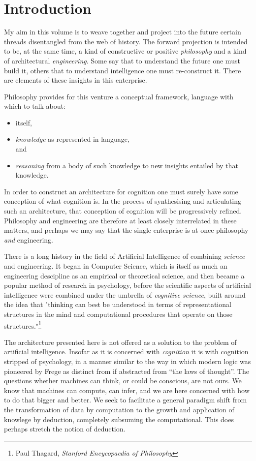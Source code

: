 \chapter{Introduction}\label{Introduction}

My aim in this volume is to weave together and project into the future certain threads disentangled from the web of history.
The forward projection is intended to be, at the same time, a kind of constructive or positive {\it philosophy} and a kind of architectural {\it engineering}.
Some say that to understand the future one must build it, others that to understand intelligence one must re-construct it.
There are elements of these insights in this enterprise.

Philosophy provides for this venture a conceptual framework, language with which to talk about:
\begin{itemize}
\item {} itself,
\item {\it knowledge} as represented in language,\\
  and
\item {\it reasoning} from a body of such knowledge to new insights entailed by that knowledge.
\end{itemize}

In order to construct an architecture for cognition one must surely have some conception of what cognition is.
In the process of synthesising and articulating such an architecture, that conception of cognition will be progressively refined.
Philosophy and engineering are therefore at least closely interrelated in these matters, and perhaps we may say that the single enterprise is at once philosophy {\it and} engineering.

There is a long history in the field of Artificial Intelligence of combining {\it science} and engineering.
It began in Computer Science, which is itself as much an engineering descipline as an empirical or theoretical science, and then became a popular method of research in psychology, before the scientific aspects of artificial intelligence were combined under the umbrella of {\it cognitive science}, built around the idea that "thinking can best be understood in terms of representational structures in the mind and computational procedures that operate on those structures."\footnote{Paul Thagard, \it Stanford Encycopaedia of Philosophy}

The architecture presented here is not offered as a solution to the problem of artificial intelligence.
Insofar as it is concerned with {\it cognition} it is with cognition stripped of psychology, in a manner similar to the way in which modern logic was pioneered by Frege as distinct from if abstracted from ``the laws of thought''.
The questions whether machines can think, or could be conscious, are not ours.
We know that machines can compute, can infer, and we are here concerned with how to do that bigger and better.
We seek to facilitate a general paradigm shift from the transformation of data by computation to the growth and application of knowlege by deduction, completely subsuming the computational.
This does perhaps stretch the notion of deduction.

